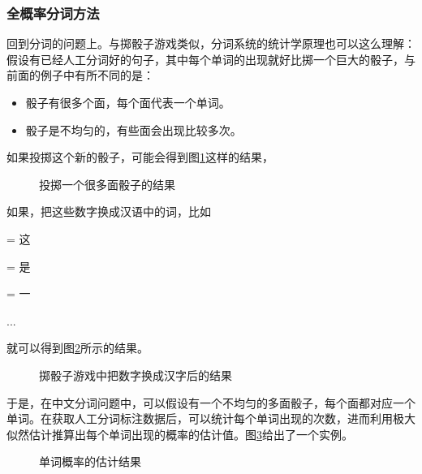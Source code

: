 \subsubsection{全概率分词方法}

\parinterval 回到分词的问题上。与掷骰子游戏类似，分词系统的统计学原理也可以这么理解：假设有已经人工分词好的句子，其中每个单词的出现就好比掷一个巨大的骰子，与前面的例子中有所不同的是：

\begin{itemize}
\vspace{0.5em}
\item 骰子有很多个面，每个面代表一个单词。
\vspace{0.5em}
\item 骰子是不均匀的，有些面会出现比较多次。
\vspace{0.5em}
\end{itemize}

\parinterval 如果投掷这个新的骰子，可能会得到图\ref{fig:2-14}这样的结果，

\begin{figure}[htp]
\centering

\caption{投掷一个很多面骰子的结果}
\label{fig:2-14}
\end{figure}

\parinterval 如果，把这些数字换成汉语中的词，比如

\; = \; 这

\; = \; 是

\; = \; 一

\parinterval ...

\parinterval 就可以得到图\ref{fig:2-15}所示的结果。

\begin{figure}[htp]
\centering

\setlength{\belowcaptionskip}{-0.2cm}
\caption{掷骰子游戏中把数字换成汉字后的结果}
\label{fig:2-15}
\end{figure}

\parinterval 于是，在中文分词问题中，可以假设有一个不均匀的多面骰子，每个面都对应一个单词。在获取人工分词标注数据后，可以统计每个单词出现的次数，进而利用极大似然估计推算出每个单词出现的概率的估计值。图\ref{fig:2-16}给出了一个实例。

\begin{figure}[htp]
\centering

\caption{单词概率的估计结果}
\label{fig:2-16}
\end{figure}

